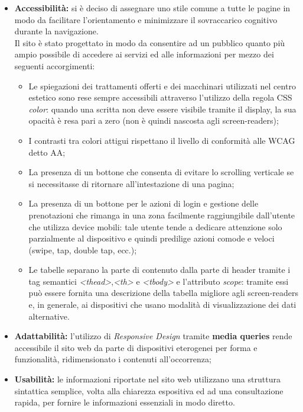 \documentclass{article}
\begin{document}
	\begin{itemize}
		\item \textbf{Accessibilità:} si è deciso di assegnare uno stile comune a tutte le pagine in modo da facilitare l'orientamento e minimizzare il sovraccarico cognitivo durante la navigazione. \\
			Il sito è stato progettato in modo da consentire ad un pubblico quanto più ampio possibile di accedere ai servizi ed alle informazioni per mezzo dei seguenti accorgimenti:
			\begin{itemize}
				\item Le spiegazioni dei trattamenti offerti e dei macchinari utilizzati nel centro estetico sono rese sempre accessibili attraverso l'utilizzo della regola CSS \textit{color}: quando una scritta non deve essere visibile tramite il display, la sua opacità è resa pari a zero (non è quindi nascosta agli screen-readers);
				\item I contrasti tra colori attigui rispettano il livello di conformità alle WCAG detto AA;
				\item La presenza di un bottone che consenta di evitare lo scrolling verticale se si necessitasse di ritornare all'intestazione di una pagina; 
				\item La presenza di un bottone per le azioni di login e gestione delle prenotazioni che rimanga in una zona facilmente raggiungibile dall'utente che utilizza device mobili: tale utente tende a dedicare attenzione solo parzialmente al dispositivo e quindi predilige azioni comode e veloci (swipe, tap, double tap, ecc.); 						
				\item Le tabelle separano la parte di contenuto dalla parte di header tramite i tag semantici \textit{<thead>},\textit{<th>} e \textit{<tbody>} e l'attributo \textit{scope}: tramite essi può essere fornita una descrizione della tabella migliore agli screen-readers e, in generale, ai dispositivi che usano modalità di visualizzazione dei dati alternative.
			\end{itemize}
			\item \textbf{Adattabilità:} l'utilizzo di \textit{Responsive Design} tramite \textbf{media queries} rende accessibile il sito web da parte di dispositivi eterogenei per forma e funzionalità, ridimensionato i contenuti all'occorrenza;
			\item \textbf{Usabilità:} le informazioni riportate nel sito web utilizzano una struttura sintattica semplice, volta alla chiarezza espositiva ed ad una consultazione rapida, per fornire le informazioni essenziali in modo diretto.		
	\end{itemize}
\end{document}
